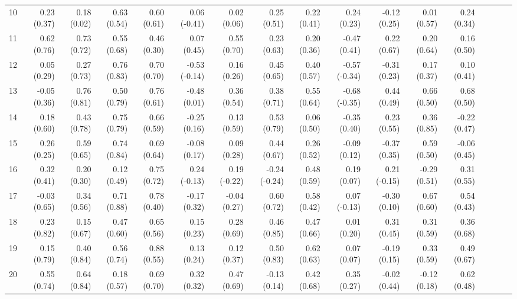 \begin{sidewaystable}[ht]
\begin{center}
\begin{tabular}{rrrrr|rrrr|rrrr|rrrr}
    10 & 0.23 (0.37) & 0.18 (0.02) & 0.63 (0.54) & 0.60 (0.61) & 0.06 (-0.41) & 0.02 (0.06) & 0.25 (0.51) & 0.22 (0.41) & 0.24 (0.23) & -0.12 (0.25) & 0.01 (0.57) & 0.24 (0.34) \\ 
    11 & 0.62 (0.76) & 0.73 (0.72) & 0.55 (0.68) & 0.46 (0.30) & 0.07 (0.45) & 0.55 (0.70) & 0.23 (0.63) & 0.20 (0.36) & -0.47 (0.41) & 0.22 (0.67) & 0.20 (0.64) & 0.16 (0.50) \\ 
    12 & 0.05 (0.29) & 0.27 (0.73) & 0.76 (0.83) & 0.70 (0.70) & -0.53 (-0.14) & 0.16 (0.26) & 0.45 (0.65) & 0.40 (0.57) & -0.57 (-0.34) & -0.31 (0.23) & 0.17 (0.37) & 0.10 (0.41) \\ 
    13 & -0.05 (0.36) & 0.76 (0.81) & 0.50 (0.79) & 0.76 (0.61) & -0.48 (0.01) & 0.36 (0.54) & 0.38 (0.71) & 0.55 (0.64) & -0.68 (-0.35) & 0.44 (0.49) & 0.66 (0.50) & 0.68 (0.50) \\ 
    14 & 0.18 (0.60) & 0.43 (0.78) & 0.75 (0.79) & 0.66 (0.59) & -0.25 (0.16) & 0.13 (0.59) & 0.53 (0.79) & 0.06 (0.50) & -0.35 (0.40) & 0.23 (0.55) & 0.36 (0.85) & -0.22 (0.47) \\ 
    15 & 0.26 (0.25) & 0.59 (0.65) & 0.74 (0.84) & 0.69 (0.64) & -0.08 (0.17) & 0.09 (0.28) & 0.44 (0.67) & 0.26 (0.52) & -0.09 (0.12) & -0.37 (0.35) & 0.59 (0.50) & -0.06 (0.45) \\ 
    16 & 0.32 (0.41) & 0.20 (0.30) & 0.12 (0.49) & 0.75 (0.72) & 0.24 (-0.13) & 0.19 (-0.22) & -0.24 (-0.24) & 0.48 (0.59) & 0.19 (0.07) & 0.21 (-0.15) & -0.29 (0.51) & 0.31 (0.55) \\ 
    17 & -0.03 (0.65) & 0.34 (0.56) & 0.71 (0.88) & 0.78 (0.40) & -0.17 (0.32) & -0.04 (0.27) & 0.60 (0.72) & 0.58 (0.42) & 0.07 (-0.13) & -0.30 (0.10) & 0.67 (0.60) & 0.54 (0.43) \\ 
    18 & 0.23 (0.82) & 0.15 (0.67) & 0.47 (0.60) & 0.65 (0.56) & 0.15 (0.23) & 0.28 (0.69) & 0.46 (0.85) & 0.47 (0.66) & 0.01 (0.20) & 0.31 (0.45) & 0.31 (0.59) & 0.36 (0.68) \\ 
    19 & 0.15 (0.79) & 0.40 (0.84) & 0.56 (0.74) & 0.88 (0.55) & 0.13 (0.24) & 0.12 (0.37) & 0.50 (0.83) & 0.62 (0.63) & 0.07 (0.07) & -0.19 (0.15) & 0.33 (0.59) & 0.49 (0.67) \\ 
    20 & 0.55 (0.74) & 0.64 (0.84) & 0.18 (0.57) & 0.69 (0.70) & 0.32 (0.32) & 0.47 (0.69) & -0.13 (0.14) & 0.42 (0.68) & 0.35 (0.27) & -0.02 (0.44) & -0.12 (0.18) & 0.62 (0.48) \\
   \bottomrule
\end{tabular}
\end{center}
\end{sidewaystable}
